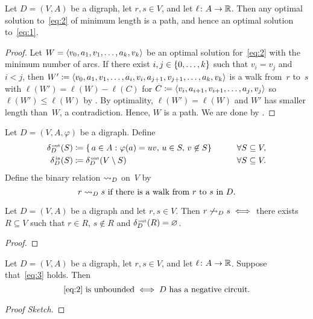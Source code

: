 \documentclass[10pt,reqno]{amsart}
\begin{document}
\begin{proposition}
  \label{prop:1}
  Let \(D = (V,A)\) be a digraph, let \(r,s \in V\), and let
  \(\ell \colon A \to \Reals\).  Then any optimal solution
  to~\eqref{eq:2} of minimum length is a path, and hence an optimal
  solution to~\eqref{eq:1}.
\end{proposition}
\begin{proof}
  Let \(W = \seq{v_0,a_1,v_1,\dotsc,a_k,v_k}\) be an optimal solution
  for~\eqref{eq:2} with the minimum number of arcs.  If there exist
  \(i,j \in \set{0,\dotsc,k}\) such that \(v_i = v_j\) and \(i < j\),
  then
  \(W' \coloneqq
  \seq{v_0,a_1,v_1,\dotsc,a_i,v_i,a_{j+1},v_{j+1},\dotsc,a_k,v_k}\) is
  a walk from~\(r\) to~\(s\) with \(\ell(W') = \ell(W) - \ell(C)\) for
  \(C \coloneqq \seq{v_i,a_{i+1},v_{i+1},\dotsc,a_j,v_j}\) so
  \(\ell(W') \leq \ell(W)\) by .  By optimality,
  \(\ell(W') = \ell(W)\) and \(W'\) has smaller length than~\(W\), a
  contradiction.  Hence, \(W\) is a path.  We are done by .
\end{proof}

Let \(D = (V,A,\varphi)\) be a digraph.  Define
\begin{alignat*}{2}
  \label{eq:8}
  \deltaout[D](S)
  & \coloneqq
  \setst{
    a \in A
  }{
    \varphi(a) = uv,\,
    u \in S,\,
    v \not\in S
  }
  & \qquad &
  \forall S \subseteq V,
  \\
  \deltain[D](S)
  & \coloneqq
  \deltaout[D](V \setminus S)
  & \qquad &
  \forall S \subseteq V.
\end{alignat*}
Define the binary relation \(\reaches_D\) on~\(V\) by
\begin{equation*}
  r \reaches_D s
  \text{ if there is a walk from~\(r\) to~\(s\) in~\(D\)}.
\end{equation*}

\begin{theorem}
  Let \(D = (V,A)\) be a digraph and let \(r,s \in V\).  Then
  \(r \not\reaches_D s \iff\) there exists \(R \subseteq V\) such that
  \(r \in R\), \(s \not\in R\) and \(\deltaout[D](R) = \emptyset\).
\end{theorem}
\begin{proof}
  
\end{proof}

\begin{proposition}
  \label{prop:2}
  Let \(D = (V,A)\) be a digraph, let \(r,s \in V\), and let
  \(\ell \colon A \to \Reals\).  Suppose that~\eqref{eq:3} holds.
  Then
  \begin{equation}
    \label{eq:4}
    \text{\eqref{eq:2} is unbounded}
    \iff
    \text{\(D\) has a negative circuit}.
  \end{equation}
\end{proposition}
\begin{proof}[Proof Sketch]
  
\end{proof}
\end{document}
